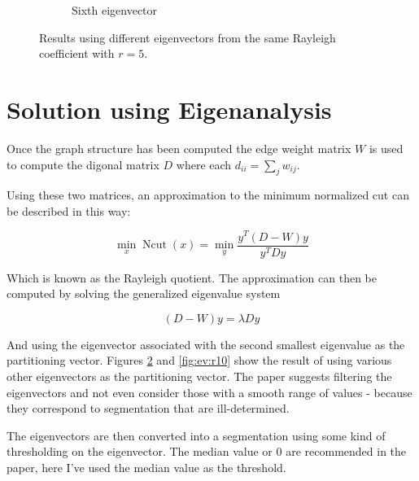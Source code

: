 \documentclass[11pt]{article}
\DeclareMathOperator{\Ncut}{Ncut}
\begin{document}
\begin{figure}
\begin{subfigure}[b]{0.4\textwidth}
\caption{Sixth eigenvector}
\label{fig:ev6:r5}
\end{subfigure}
\caption{Results using different eigenvectors from the same Rayleigh coefficient with $r=5$.}
\label{fig:ev:r5}
\end{figure}


\section{Solution using Eigenanalysis}

Once the graph structure has been computed the edge weight matrix $W$ is used to compute the digonal matrix $D$ where each $d_{ii} = \sum_j w_{ij}$.

Using these two matrices, an approximation to the minimum normalized cut can be described in this way:

\begin{equation*}
  \min_x \Ncut(x) = \min_y \frac{y^T(D-W)y}{y^TDy}
\end{equation*}

Which is known as the Rayleigh quotient.
The approximation can then be computed by solving the generalized eigenvalue system

\begin{equation*}
  (D-W)y=\lambda Dy
\end{equation*}

And using the eigenvector associated with the second smallest eigenvalue as the partitioning vector.
Figures \ref{fig:ev:r5} and \ref{fig:ev:r10} show the result of using various other eigenvectors as the partitioning vector.
The paper suggests filtering the eigenvectors and not even consider those with a smooth range of values - because they correspond to segmentation that are ill-determined.

The eigenvectors are then converted into a segmentation using some kind of thresholding on the eigenvector.
The median value or $0$ are recommended in the paper, here I've used the median value as the threshold.
\end{document}
